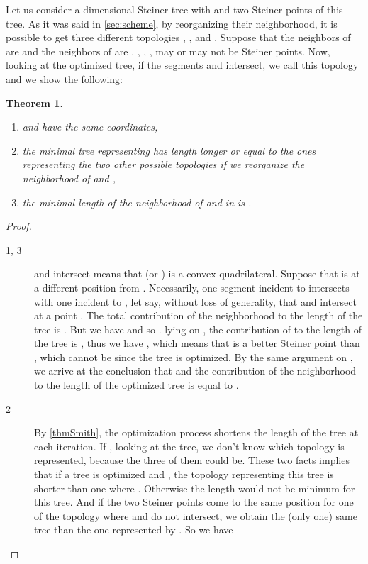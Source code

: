 \documentclass{article}
\theoremstyle{plain}
\newtheorem{theorem}{Theorem}[section]
\begin{document}
Let us consider a dimensional Steiner tree with  and  two Steiner points of this tree. 
As it was said in \cref{sec:scheme}, by reorganizing their neighborhood, it is possible to get three different topologies , , and . 
Suppose that the neighbors of  are  and the neighbors of  are . 
, , ,  may or may not be Steiner points. 
Now, looking at the optimized tree,  if the segments  and  intersect, we call this topology  and we show the following:
\begin{theorem}\mbox{ }
\begin{enumerate}
\item{ and  have the same coordinates,}
\item{the minimal tree representing  has length longer or equal to the ones representing the two other possible topologies if we reorganize the neighborhood of  and ,}
\item{the minimal length of the neighborhood of  and  in  is .}
\end{enumerate}
\end{theorem}
\begin{proof}\mbox{ }
\begin{description}
\item[1, 3] and  intersect means that  (or ) is a convex quadrilateral. 
Suppose that  is at a different position from . 
Necessarily, one segment incident to  intersects with one incident to , let say, without loss of generality, that  and  intersect at a point . 
The total contribution of the neighborhood to the length of the tree is . 
But we have  and  so . 
 lying on , the contribution of  to the length of the tree is , thus we have , which means that  is a better Steiner point than , which cannot be since the tree is optimized. 
By the same argument on , we arrive at the conclusion that  and the contribution of the neighborhood to the length of the optimized tree is equal to .
\item[2]By \cref{thmSmith}, the optimization process shortens the length of the tree at each iteration. If , looking at the tree, we don't know which topology is represented, because the three of them could be. 
These two facts implies that if a tree is optimized and , the topology representing this tree is shorter than one where . 
Otherwise the length  would not be minimum for this tree. 
And if the two Steiner points come to the same position for one of the topology where  and  do not intersect, we obtain the (only one) same tree than the one represented by . 
So we have    
\end{description}
\end{proof}
\end{document}
